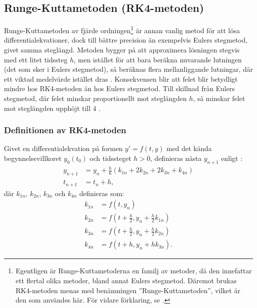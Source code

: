 \subsection{Runge-Kuttametoden (RK4-metoden)}
Runge-Kuttametoden av fjärde ordningen\footnote{Egentligen är Runge-Kuttametoderna en familj av metoder, då den innefattar ett flertal olika metoder, bland annat Eulers stegmetod. Däremot brukas RK4-metoden menas med benämningen ''Runge-Kuttametoden'', vilket är den som användes här. För vidare förklaring, se \cite{Runge-Kutta_method/Butcher2008}. } är annan vanlig metod för att lösa differentialekvationer, dock till bättre precision än exempelvis Eulers stegmetod, givet samma steglängd. Metoden bygger på att approximera lösningen stegvis med ett litet tidssteg $h$, men istället för att bara beräkna nuvarande lutningen (det som sker i Eulers stegmetod), så beräknas flera mellanliggande lutningar, där ett viktad medelvärde istället dras \cite{runge_kutta_methods_2026}. Konsekvensen blir att felet blir betydligt mindre hos RK4-metoden än hos Eulers stegmetod. Till skillnad från Eulers stegmetod, där felet minskar proportionellt mot steglängden $h$, så minskar felet mot steglängden upphöjt till 4 \cite{runge_kutta_methods_2026}. 

\subsubsection{Definitionen av RK4-metoden}

Givet en differentialekvation på formen $y' = f(t,y)$ med det kända begynnelsevillkoret $y_0(t_0)$ och tidssteget $h > 0$, definieras nästa $y_{n+1}$ enligt \cite{runge_kutta_methods_2026}:
\begin{align}
    y_{n+1} &= y_n + \frac{h}{6} \left(k_{1n} + 2k_{2n} + 2k_{3n} + k_{4n}\right) \\
    t_{n+1} &= t_n + h,
\end{align}
där $k_{1n}$, $k_{2n}$, $k_{3n}$ och $k_{4n}$ definieras som:
\begin{align}
    k_{1n} &= f(t, y_n) \\
    k_{2n} &= f\left(t + \frac{h}{2}, y_n + \frac{h}{2}k_{1n}\right) \\
    k_{3n} &= f\left(t + \frac{h}{2}, y_n + \frac{h}{2}k_{2n}\right) \\
    k_{4n} &= f\left(t + h, y_n + hk_{3n}\right).
\end{align}

